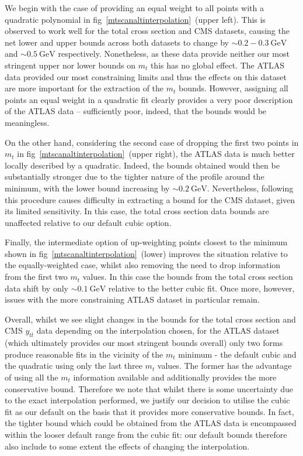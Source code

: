 \documentclass[sn-mathphys]{sn-jnl}%
\newcommand{\ytt}{y_{t\bar{t}}}
\newcommand{\mt}{m_t}
\newcommand{\gev}{\mathrm{GeV}}
\begin{document}
We begin with the case of providing an equal weight to all points with a quadratic polynomial in fig~\ref{mtscanaltinterpolation}~(upper left). This is observed to work well for the total cross section and CMS datasets, causing the net lower and upper bounds across both datasets to change by $\sim 0.2-0.3~\gev$ and $\sim 0.5~\gev$ respectively. Nonetheless, as these data provide neither our most stringent upper nor lower bounds on $\mt$ this has no global effect. The ATLAS data provided our most constraining limits and thus the effects on this dataset are more important for the extraction of the $\mt$ bounds. However, assigning all points an equal weight in a quadratic fit clearly provides a very poor description of the ATLAS data -- sufficiently poor, indeed, that the bounds would be meaningless.

On the other hand, considering the second case of dropping the first two points in $\mt$ in fig~\ref{mtscanaltinterpolation}~(upper right), the ATLAS data is much better locally described by a quadratic. Indeed, the bounds obtained would then be substantially stronger due to the tighter nature of the profile around the minimum, with the lower bound increasing by $\sim 0.2~\gev$. Nevertheless, following this procedure causes difficulty in extracting a bound for the CMS dataset, given its limited sensitivity. In this case, the total cross section data bounds are unaffected relative to our default cubic option. 

Finally, the intermediate option of up-weighting points closest to the minimum shown in  fig~\ref{mtscanaltinterpolation}~(lower) improves the situation relative to the equally-weighted case, whilst also removing the need to drop information from the first two $\mt$ values. In this case the bounds from the %
total cross section data shift by only $\sim 0.1~\gev$  relative to the better cubic fit. Once more, however, issues with the more constraining ATLAS dataset in particular remain. 

Overall, whilst we see slight changes in the bounds for the total cross section and CMS $\ytt$ data depending on the interpolation chosen, for the ATLAS dataset (which ultimately provides our most stringent bounds overall) only two forms produce reasonable fits in the vicinity of the $\mt$ minimum - the default cubic and the quadratic using only the last three $\mt$ values. The former has the advantage of using all the $\mt$ information available and additionally provides the more conservative bound. Therefore we note that whilst there is some uncertainty due to the exact interpolation performed, we justify our decision to utilise the cubic fit as our default on the basis that it provides more conservative bounds. In fact, the tighter bound which could be obtained from the ATLAS data is encompassed within the looser default range from the cubic fit: our default bounds therefore also include to some extent the effects of changing the interpolation.  
\end{document}

